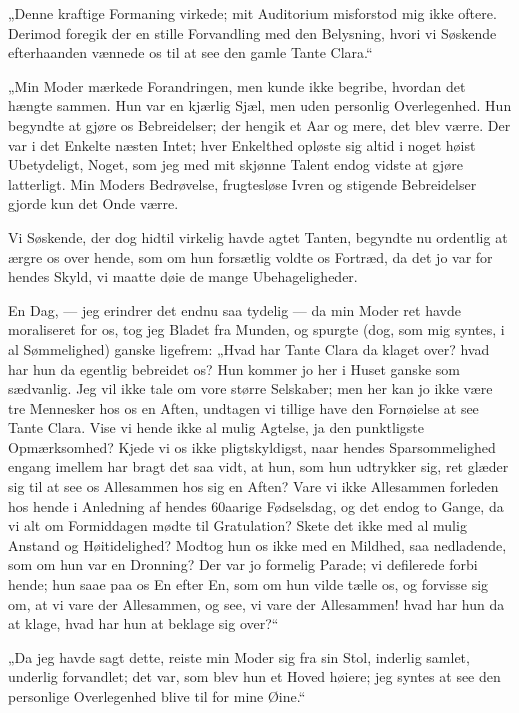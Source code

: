 \documentclass[12pt,a4paper]{book}
\newcommand{\apage}[1]{\marginnote{\footnotesize\textit{[#1]}}}
\begin{document}
„Denne kraftige Formaning virkede; mit Auditorium misforstod mig ikke oftere. Derimod foregik der en stille Forvandling med den Belysning, hvori vi Søskende efterhaanden vænnede os til at see den gamle Tante Clara.“

„Min Moder mærkede Forandringen, men kunde ikke begribe, hvordan det hængte sammen. Hun var en kjærlig Sjæl, men uden personlig Overlegenhed. Hun begyndte at gjøre os Bebreidelser; der hengik et Aar og mere, det blev værre. Der var i det Enkelte næsten Intet; hver Enkelthed opløste sig altid i noget høist Ubetydeligt, Noget, som jeg med mit skjønne Talent endog vidste at gjøre latterligt. Min Moders Bedrøvelse, frugtesløse Ivren og stigende Bebreidelser gjorde kun det Onde værre.
 \apage{74}

Vi Søskende, der dog hidtil virkelig havde agtet Tanten, begyndte nu ordentlig at ærgre os over hende, som om hun forsætlig voldte os Fortræd, da det jo var for hendes Skyld, vi maatte døie de mange Ubehageligheder.

En Dag, — jeg erindrer det endnu saa tydelig — da min Moder ret havde moraliseret for os, tog jeg Bladet fra Munden, og spurgte (dog, som mig syntes, i al Sømmelighed) ganske ligefrem: „Hvad har Tante Clara da klaget over? hvad har hun da egentlig bebreidet os? Hun kommer jo her i Huset ganske som sædvanlig. Jeg vil ikke tale om vore større Selskaber; men her kan jo ikke være tre Mennesker hos os en Aften, undtagen vi tillige have den Fornøielse at see Tante Clara. Vise vi hende ikke al mulig Agtelse, ja den punktligste Opmærksomhed? Kjede vi os ikke pligtskyldigst, naar hendes Sparsommelighed engang imellem har bragt det saa vidt, at hun, som hun udtrykker sig, ret glæder sig til at see os Allesammen hos sig en Aften? Vare vi ikke Allesammen forleden hos hende i Anledning af hendes 60aarige Fødselsdag, og det endog to Gange, da vi alt om Formiddagen mødte til Gratulation? Skete det ikke med al mulig Anstand og Høitidelighed? Modtog hun os ikke med en Mildhed, saa nedladende, som om hun var en Dronning? Der var jo formelig Parade; vi defilerede forbi hende; hun saae paa os En efter En, som om hun vilde tælle os, og forvisse sig om, at vi vare der Allesammen, og see, vi vare der Allesammen! hvad har hun da at klage, hvad har hun at beklage sig over?“

„Da jeg havde sagt dette, reiste min Moder sig fra sin Stol, inderlig samlet, underlig forvandlet; det var, som blev hun et Hoved høiere; jeg syntes at see den personlige Overlegenhed blive til for mine Øine.“
\end{document}
